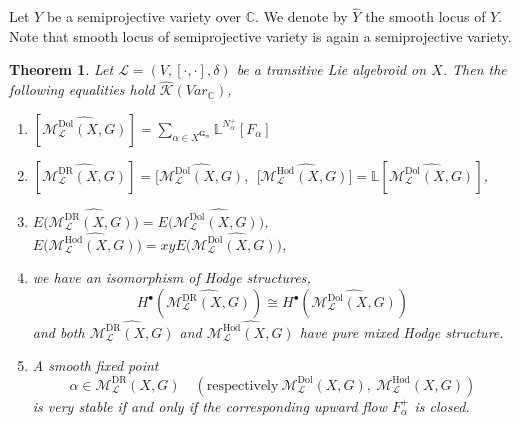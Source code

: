 \documentclass[12pt,reqno]{amsart}
\numberwithin{equation}{subsection}
\newtheorem{thm}[equation]{Theorem}
\theoremstyle{definition}
\theoremstyle{theorem}
\begin{document}
Let \(Y\) be a semiprojective variety over \(\mathbb{C}\). We denote by \(\widehat{Y}\) the smooth locus of \(Y\). Note that smooth locus of semiprojective variety is again a semiprojective variety.
\begin{thm}\label{thm:motivic equality of dr-dol-Hod principal moduli space}
	Let $\mathcal{L} = (V,[·,·],\delta)$ be a transitive Lie algebroid on $X$. Then the following equalities hold $\hat{\mathcal{K}}(Var_{\mathbb{C}})$,
	
	\begin{enumerate}
		\item $[\widehat{\mathcal{M}^{\text{Dol}}_{\mathcal{L}}(X,G)}]=\sum_{\alpha\in X^{\mathbf{G}_{m}}}\mathbb{L}^{N_{\alpha}^{+}}[F_{\alpha}]$
		
		\item $[\widehat{\mathcal{M}^{\text{DR}}_{\mathcal{L}}(X,G)}] = [\widehat{\mathcal{M}_{\mathcal{L}}^{\text{Dol}}(X,G)}, \ \  [\widehat{\mathcal{M}_{\mathcal{L}}^{\text{Hod}}(X,G)]} = \mathbb{L}[\widehat{\mathcal{M}_{\mathcal{L}}^{\text{Dol}}(X,G)}]$,
		
		\item $E(\widehat{\mathcal{M}_{\mathcal{L}}^{\text{DR}}(X,G))} = E(\widehat{\mathcal{M}_{\mathcal{L}}^{\text{Dol}}(X,G))}$, \ \  $E(\widehat{\mathcal{M}_{\mathcal{L}}^{\text{Hod}}(X,G))} = xyE(\widehat{\mathcal{M}_{\mathcal{L}}^{\text{Dol}}(X,G))}$,
		
		\item we have an isomorphism of Hodge structures,
		\[H^{\bullet}(\widehat{\mathcal{M}_{\mathcal{L}}^{\text{DR}}(X,G)}) \cong H^{\bullet}(\widehat{\mathcal{M}_{\mathcal{L}}^{\text{Dol}}(X,G)})\]and both $\widehat{\mathcal{M}_{\mathcal{L}}^{\text{DR}}(X,G)}$ and $\widehat{\mathcal{M}_{\mathcal{L}}^{\text{Hod}}(X,G)}$ have pure mixed Hodge structure.
		
		
		\item A smooth fixed point 
		\[
		\alpha \in \mathcal{M}^{\mathrm{DR}}_{\mathcal{L}}(X,G)
		\quad 
		\left(\text{respectively} \ 
		\mathcal{M}^{\mathrm{Dol}}_{\mathcal{L}}(X,G),\ 
		\mathcal{M}^{\mathrm{Hod}}_{\mathcal{L}}(X,G)
		\right)
		\]
		is very stable if and only if the corresponding upward flow \(F^{+}_{\alpha}\) is closed.
	\end{enumerate}
	
\end{thm}
\end{document}
